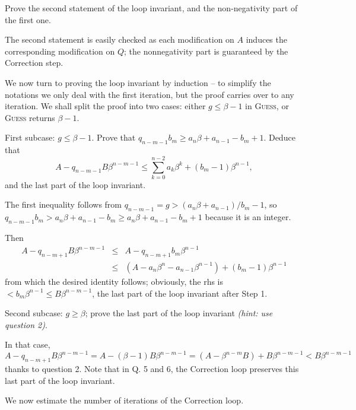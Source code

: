 \documentclass[11pt]{exam}
\theoremstyle{definition}
\begin{document}
\begin{questions}
\question Prove the second statement of the loop invariant, and the
non-negativity part of the first one.

\begin{solution}
The second statement is easily checked as each modification
on $A$ induces the corresponding modification on $Q$; the nonnegativity
part is guaranteed by the Correction step. 
\end{solution}
\bigskip

We now turn to proving the loop invariant by induction -- to simplify
the notations we only deal with the first iteration, but the proof
carries over to any iteration. We shall split the proof into two
cases: either $g\leq \beta - 1$ in \textsc{Guess}, or \textsc{Guess} returns $\beta -
1$.
\bigskip

\question First subcase: $g\leq \beta - 1$. Prove that
$q_{n-m-1} b_m \geq a_n \beta + a_{n-1} - b_m + 1$. Deduce that
$$A - q_{n-m-1} B \beta^{n-m-1} \leq \sum_{k=0}^{n-2} a_k \beta^k + (b_m - 1) \beta^{n-1},$$
and the last part of the loop invariant.
\bigskip

\begin{solution}
The first inequality follows from
$q_{n-m-1} = g > (a_n \beta + a_{n-1}) / b_m - 1$, so $q_{n-m-1} b_m > a_n \beta + a_{n-1} - b_m \geq a_n \beta + a_{n-1} - b_m + 1$ because it is an integer.

Then
\begin{eqnarray*}
  A - q_{n-m+1} B \beta^{n-m-1} & \leq & A - q_{n-m+1} b_m \beta^{n-1}\\
  & \leq &
  (A - a_n \beta^n - a_{n-1} \beta^{n-1}) + (b_m - 1) \beta^{n-1}
\end{eqnarray*}
from which the desired identity follows; obviously, the rhs is $< b_m
\beta^{n-1} \leq B \beta^{n-m-1}$, the last part of the loop invariant after
Step 1. 
\end{solution}

\question Second subcase: $g \geq \beta$; prove the last part of the
loop invariant \textit{(hint: use question 2)}. 

\begin{solution}
In that case, $A - q_{n-m+1} B \beta^{n-m-1} = A - (\beta - 1)
B \beta^{n-m-1} = (A - \beta^{n-m} B) + B \beta^{n-m-1} < B \beta^{n-m-1}$
thanks to question 2.
Note that in Q. 5 and 6, the Correction loop preserves this last part of the loop invariant.
\end{solution}
\bigskip

We now estimate the number of iterations of the Correction loop.
\bigskip


\end{questions}
\end{document}

